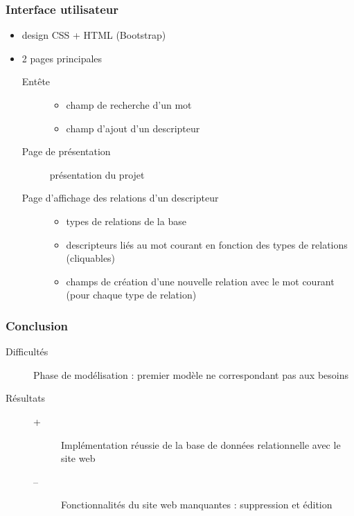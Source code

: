 \documentclass{beamer}
\begin{document}
\begin{frame}
\frametitle{Interface utilisateur}
\begin{itemize}
\item design CSS + HTML (Bootstrap)
\item 2 pages principales
\begin{description}
\item[Entête]
\begin{itemize}
\item  champ de recherche d'un mot 
\item champ d'ajout d'un descripteur 
\end{itemize}
\item[Page de présentation]présentation du projet 
\item[Page d'affichage des relations d'un descripteur] 
\begin{itemize}
\item types de relations de la base
\item descripteurs liés au mot courant en fonction des types de relations (cliquables)
\item champs de création d'une nouvelle relation avec le mot courant (pour chaque type de relation)
\end{itemize}
\end{description}
\end{itemize}
\end{frame}


\begin{frame}
\frametitle{Conclusion}
\begin{description}
\item[Difficultés]Phase de modélisation : premier modèle ne correspondant pas aux besoins
\item [Résultats ] 
\begin{description}
\item[+]Implémentation réussie de la base de données relationnelle avec le site web
\item[--]Fonctionnalités du site web manquantes : suppression et édition 
\end{description}
\end{description}
\end{frame}
\end{document}
